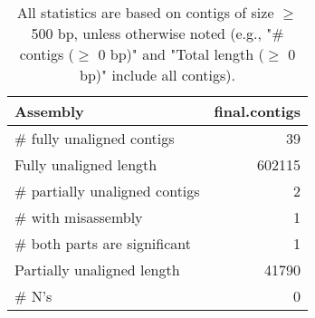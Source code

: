 \documentclass[12pt,a4paper]{article}
\begin{document}
\begin{table}[ht]
\begin{center}
\caption{All statistics are based on contigs of size $\geq$ 500 bp, unless otherwise noted (e.g., "\# contigs ($\geq$ 0 bp)" and "Total length ($\geq$ 0 bp)" include all contigs).}
\begin{tabular}{|l*{1}{|r}|}
\hline
Assembly & final.contigs \\ \hline
\# fully unaligned contigs & 39 \\ \hline
Fully unaligned length & 602115 \\ \hline
\# partially unaligned contigs & 2 \\ \hline
\hspace{5mm}\# with misassembly & 1 \\ \hline
\hspace{5mm}\# both parts are significant & 1 \\ \hline
Partially unaligned length & 41790 \\ \hline
\# N's & 0 \\ \hline
\end{tabular}
\end{center}
\end{table}
\end{document}
